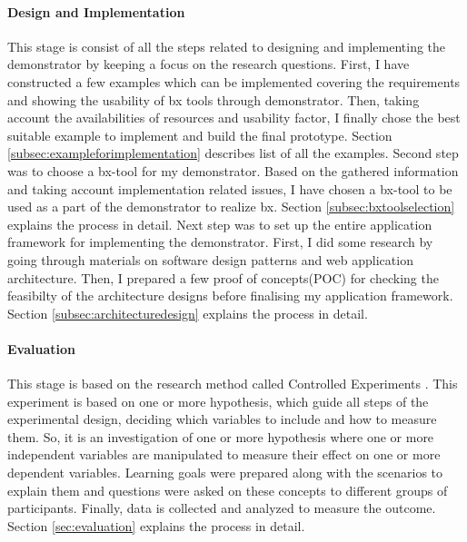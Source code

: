 \paragraph{Design and Implementation}
This stage is consist of all the steps related to designing and implementing the demonstrator by keeping a focus on the research questions.
\newline\newline First, I have constructed a few examples which can be implemented covering the requirements and showing the usability of bx tools through demonstrator. Then, taking account the availabilities of resources and usability factor, I finally chose the best suitable example to implement and build the final prototype. Section \ref{subsec:exampleforimplementation} describes list of all the examples.
\newline\newline Second step was to choose a bx-tool for my demonstrator. Based on the gathered information and taking account implementation related issues, I have chosen a bx-tool to be used as a part of the demonstrator to realize bx. Section \ref{subsec:bxtoolselection} explains the process in detail.
\newline\newline Next step was to set up the entire application framework for implementing the demonstrator. First, I did some research by going through materials on software design patterns and web application architecture. Then, I prepared a few proof of concepts(POC) for checking the feasibilty of the architecture designs before finalising my application framework. Section \ref{subsec:architecturedesign} explains the process in detail.

\paragraph{Evaluation} 
This stage is based on the research method called Controlled Experiments \cite{semethods}. This experiment is based on one or more hypothesis, which guide all steps of the experimental design, deciding which variables to include and how to measure them. So, it is an investigation of one or more hypothesis where one or more independent variables are manipulated to measure their effect on one or more
dependent variables. Learning goals were prepared along with the scenarios to explain them and questions were asked on these concepts to different groups of participants. Finally, data is collected and analyzed to measure the outcome. Section \ref{sec:evaluation} explains the process in detail.

